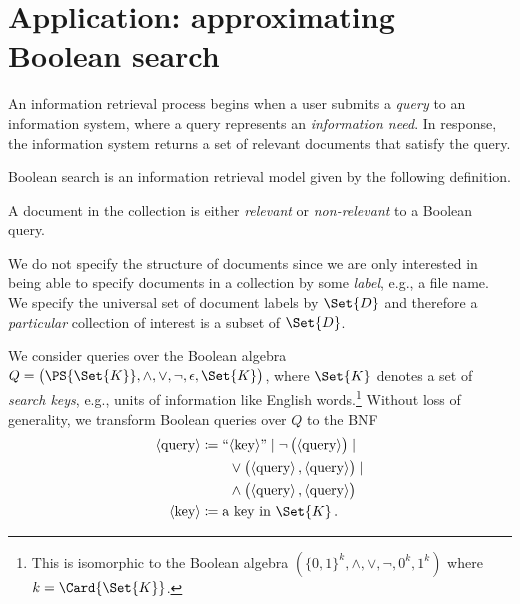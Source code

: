 \documentclass[ ../main.tex]{subfiles}
\begin{document}
\section{Application: approximating Boolean search}
\label{sec:bool_search}

An information retrieval process begins when a user submits a \emph{query} to an information system, where a query represents an \emph{information need}.
In response, the information system returns a set of relevant documents that satisfy the query.

Boolean search is an information retrieval model given by the following definition.
\begin{definition}
A document in the collection is either \emph{relevant} or \emph{non-relevant} to a Boolean query.
\end{definition}
We do not specify the structure of documents since we are only interested in being able to specify documents in a collection by some \emph{label}, e.g., a file name.
We specify the universal set of document labels by $\Set{D}$ and therefore a \emph{particular} collection of interest is a subset of $\Set{D}$.

We consider queries over the Boolean algebra $Q = \left(\PS{\Set{K}}, \land, \lor, \neg, \epsilon, \Set{K}\right)$, where $\Set{K}$ denotes a set of \emph{search keys}, e.g., units of information like English words.\footnote{This is isomorphic to the Boolean algebra $\left(\{0,1\}^k, \land,\lor,\neg,0^k,1^k\right)$ where $k=\Card{\Set{K}}$.}
Without loss of generality, we transform Boolean queries over $Q$ to the BNF
\begin{align*}
\langle\text{query} \rangle & \coloneqq
	\text{``} \langle \text{key} \rangle\text{''} \mid \neg \left(\langle \text{query} \rangle \right) \mid\\
	& \qquad \lor \left(\langle \text{query} \rangle\,,\langle \text{query} \rangle\right) \mid\\
	& \qquad \land \left(\langle \text{query} \rangle\,,\langle \text{query} \rangle\right)\\
\langle\text{key}\rangle & \coloneqq \text{a key in $\Set{K}$}\,.
\end{align*}
\end{document}
